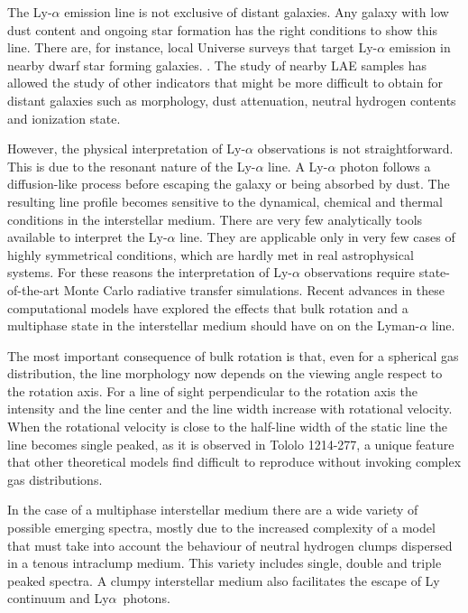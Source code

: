 \documentclass[a4paper, usenatbib, 12pt]{article}
\newcommand{\tol}{Tololo 1214-277}
\newcommand{\lya}{Ly$\alpha$}
\begin{document}
{The Ly-$\alpha$ emission line is not exclusive of distant galaxies. 
Any galaxy with low dust content and ongoing star formation has the
right conditions to show this line.  
There are, for instance,  local Universe surveys that target
Ly-$\alpha$ emission in nearby dwarf star forming galaxies. 
\cite{LARS}. 
The study of nearby LAE samples has allowed the study of other
indicators that might be more difficult to obtain for distant galaxies
such as morphology, dust attenuation, neutral hydrogen contents and
ionization state.  

However, the physical interpretation of Ly-$\alpha$ observations is
not straightforward. 
This is due to the resonant nature of the Ly-$\alpha$ line. 
A Ly-$\alpha$ photon follows a diffusion-like process before escaping
the galaxy or being absorbed by dust. 
The resulting line profile becomes sensitive to the dynamical, chemical
and thermal conditions in the interstellar medium. 
There are very few analytically tools available to interpret the
Ly-$\alpha$ line.
They are applicable only in very few cases of highly symmetrical
conditions, which are hardly met in real astrophysical systems.
For these reasons the interpretation of Ly-$\alpha$ observations
require state-of-the-art Monte Carlo radiative transfer simulations.   
Recent advances in these computational models have explored the
effects that bulk rotation and a multiphase state in the interstellar
medium should have on on the Lyman-$\alpha$ line.

The most important consequence of bulk rotation is that, even for a
spherical gas distribution, the line morphology now depends on the
viewing angle respect to the rotation axis.  
For a line of sight perpendicular to the rotation axis the intensity
and the line center and the line width increase with rotational
velocity. 
When the rotational velocity is close to the half-line width of the
static line the line becomes single peaked, as it is observed in
\tol, a unique feature that other theoretical models find
difficult to reproduce without invoking complex gas distributions.

In the case of a multiphase interstellar medium there are a wide variety
of possible emerging spectra, mostly due to the increased complexity
of a model that must take into account the behaviour of neutral hydrogen
clumps dispersed in a tenous intraclump medium. 
This variety includes single, double and triple peaked
spectra. 
A clumpy interstellar medium also facilitates the escape of Ly
continuum and \lya\ photons. 

}
\end{document}
